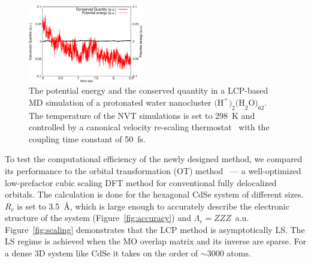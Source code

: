 \documentclass[aps,prl,twocolumn,reprint,amsmath,amssymb]{revtex4-1}
\begin{document}

\begin{figure}
\includegraphics[width=0.45\textwidth]{const.eps}
\caption{The potential energy and the conserved quantity in a LCP-based MD simulation of a protonated water nanocluster $\text{(H}^{+}\text{)}_2\text{(H}_2\text{O)}_{62}$. The temperature of the NVT simulations is set to 298~K and controlled by a canonical velocity re-scaling thermostat~\cite{bussi2007canonical} with the coupling time constant of 50~fs.}
\label{fig:md}
\end{figure}



To test the computational efficiency of the newly designed method, we compared its performance to the orbital transformation (OT) method~\cite{weber2008direct,vandevondele2003efficient} --- a well-optimized low-prefactor cubic scaling DFT method for conventional fully delocalized orbitals. The calculation is done for the hexagonal CdSe system of different sizes. $R_c$ is set to 3.5~{\AA}, which is large enough to accurately describe the electronic structure of the system (Figure~\ref{fig:accuracy}) and $\Lambda_c = ZZZ$~a.u. Figure~\ref{fig:scaling} demonstrates that the LCP method is asymptotically LS. The LS regime is achieved when the MO overlap matrix and its inverse are sparse. For a dense 3D system like CdSe it takes on the order of $\sim$3000 atoms. 
\end{document}
